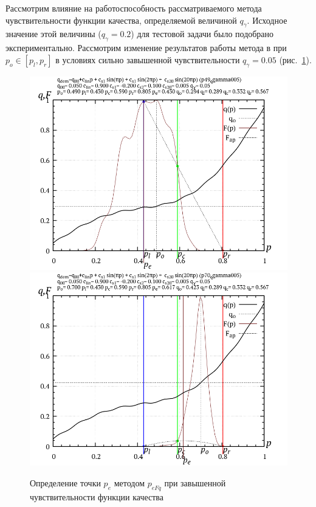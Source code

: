 Рассмотрим влияние на работоспособность рассматриваемого метода
чувствительности функции качества, определяемой величиной $q_\gamma$.
Исходное значение этой величины ($q_\gamma=0.2$) для
тестовой задачи было подобрано экспериментально.
Рассмотрим изменение результатов работы метода в при $p_o \in [p_l,p_r]$
в условиях сильно завышенной чувствительности $q_\gamma=0.05$ (рис.~\ref{atu:f:p_eFq_intra_005}).


\begin{figure}[htb!]
  \centerline{
    \includegraphics[width=49\TW]{p/p_eFq/q_p_eFq_p49_qgamma005.png}
    \hfill
    \includegraphics[width=49\TW]{p/p_eFq/q_p_eFq_p70_qgamma005.png}
  }
  \caption{Определение точки $p_e$ методом $p_{eFq}$ при завышенной чувствительности функции качества}
  \label{atu:f:p_eFq_intra_005}
\end{figure}

